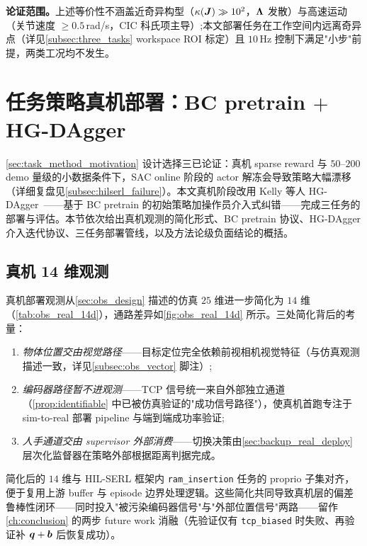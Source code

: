\textbf{论证范围。}上述等价性不涵盖近奇异构型（$\kappa(\bm{J}) \gg 10^2$，$\bm{\Lambda}$ 发散）与高速运动（关节速度 $\geq 0.5$\,rad/s，CIC 科氏项主导）;本文部署任务在工作空间内远离奇异点（详见\cref{subsec:three_tasks} workspace ROI 标定）且 $10$\,Hz 控制下满足"小步"前提，两类工况均不发生。

\section{任务策略真机部署：BC pretrain $+$ HG-DAgger}\label{sec:real_task_deploy}

\cref{sec:task_method_motivation} 设计选择三已论证：真机 sparse reward 与 $50$–$200$ demo 量级的小数据条件下，SAC online 阶段的 actor 解冻会导致策略大幅漂移（详细复盘见\cref{subsec:hilserl_failure}）。本文真机阶段改用 Kelly 等人 HG-DAgger~\cite{kelly2019hgdagger}——基于 BC pretrain 的初始策略加操作员介入式纠错——完成三任务的部署与评估。本节依次给出真机观测的简化形式、BC pretrain 协议、HG-DAgger 介入迭代协议、三任务部署管线，以及方法论级负面结论的概括。

\subsection{真机 14 维观测}\label{subsec:real_obs}

真机部署观测从\cref{sec:obs_design} 描述的仿真 $25$ 维进一步简化为 $14$ 维（\cref{tab:obs_real_14d}），通路差异如\cref{fig:obs_real_14d} 所示。三处简化背后的考量：

\begin{enumerate}
  \item \emph{物体位置交由视觉路径}——目标定位完全依赖前视相机视觉特征（与仿真观测描述一致，详见\cref{subsec:obs_vector} 脚注）;
  \item \emph{编码器路径暂不进观测}——TCP 信号统一来自外部独立通道（\cref{prop:identifiable} 中已被仿真验证的"成功信号路径"），使真机首跑专注于 sim-to-real 部署 pipeline 与端到端成功率验证;
  \item \emph{人手通道交由 supervisor 外部消费}——切换决策由\cref{sec:backup_real_deploy} 层次化监督器在策略外部根据距离判据完成。
\end{enumerate}

简化后的 $14$ 维与 HIL-SERL 框架内 \texttt{ram\_insertion} 任务的 proprio 子集对齐，便于复用上游 buffer 与 episode 边界处理逻辑。这些简化共同导致真机层的偏差鲁棒性闭环——同时投入"被污染编码器信号"与"外部位置信号"两路——留作\cref{ch:conclusion} 的两步 future work 消融（先验证仅有 \texttt{tcp\_biased} 时失败、再验证补 $\bm{q}+\bm{b}$ 后恢复成功）。

